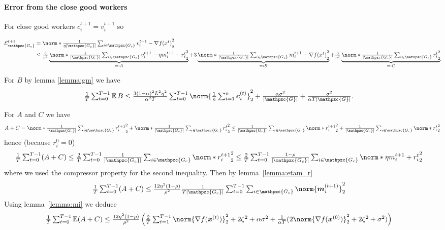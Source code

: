 \documentclass{article}
\newcommand{\gset}{\ensuremath{{\mathpzc{G}}}}
\newcommand{\gcset}{\ensuremath{{\mathpzc{G_c}}}}
\begin{document}
\paragraph*{Error from the close good workers}

For close good workers $c_i^{t+1} = v_i^{t+1}$ so

\begin{align*}
  \cE_\gcset^{t+1}
   & =
  \norm*{ \tfrac{1}{\eta |\gcset|} \tsum_{i\in\gcset} v_i^{t+1} - \nabla f(x^t) }_2^2
  \\
   & \le
  \tfrac{3}{\eta^2} \underbrace{ \norm*{ \tfrac{1}{|\gcset|} \tsum_{i\in\gcset} v_i^{t+1} - \eta m_i^{t+1} - r_i^t }_2^2 }_{=: A}
  + 3 \underbrace{ \norm*{ \tfrac{1}{|\gcset|} \tsum_{i\in\gcset} m_i^{t+1} - \nabla f(x^t)}_2^2 }_{=: B}
  + \tfrac{3}{\eta^2} \underbrace{ \norm*{ \tfrac{1}{|\gcset|} \tsum_{i\in\gcset} r_i^t }_2^2 }_{=: C}
\end{align*}

For $B$ by lemma \ref{lemma:gm} we have
\begin{align*}
  \tfrac{1}{T} \tsum_{t=0}^{T-1} \E B
   & \le
  \tfrac{3(1-\alpha)^2 L^2\eta^2}{\alpha^2T} \tsum_{t=0}^{T-1}
  \norm{ \tfrac{1}{n} \tsum_{i=1}^n \cc_i^{(t)} }_2^2
  + \tfrac{\alpha\sigma^2}{|\gset|} + \tfrac{\sigma^2}{\alpha T|\gset|}.
\end{align*}


For $A$ and $C$ we have
\begin{align*}
  A + C
  =
  \norm*{ \tfrac{1}{|\gcset|} \tsum_{i\in\gcset} r_i^{t+1} }_2^2
  + \norm*{ \tfrac{1}{|\gcset|} \tsum_{i\in\gcset} r_i^{t} }_2^2
  \le
  \tfrac{1}{|\gcset|} \tsum_{i\in\gcset} \norm*{ r_i^{t+1} }_2^2 + \tfrac{1}{|\gcset|} \tsum_{i\in\gcset} \norm*{ r_i^{t} }_2^2
\end{align*}
hence (because $r_i^0 = 0$)
\begin{align*}
  \tfrac{1}{T} \tsum_{t=0}^{T-1} (A + C)
   & \le
  \tfrac{2}{T} \tsum_{t=0}^{T-1} \tfrac{1}{|\gcset|} \tsum_{i\in\gcset} \norm*{ r_i^{t+1} }_2^2
  \le
  \tfrac{2}{T} \tsum_{t=0}^{T-1} \tfrac{1 - \rho}{|\gcset|} \tsum_{i\in\gcset} \norm*{ \eta m_i^{t+1} + r_i^t }_2^2
\end{align*}
where we used the compressor property for the second inequality.
Then by lemma~\ref{lemma:etam_r}
\begin{align*}
  \tfrac{1}{T} \tsum_{t=0}^{T-1} (A+C)
   & \le
  \tfrac{12\eta^2(1-\rho)}{\rho^2} \tfrac{1}{T|\gcset|}  \tsum_{t=0}^{T-1} \tsum_{i\in\gcset}\norm{\mm_i^{(t+1)} }_2^2
\end{align*}
Using lemma~\ref{lemma:mi} we deduce
\begin{align*}
  \tfrac{1}{T} \tsum_{t=0}^{T-1} \E (A+C)
   & \le
  \tfrac{12\eta^2(1-\rho)}{\rho^2}
  \left(
  \tfrac{2}{T}\tsum_{t=1}^{T-1} \norm{\nabla f(\xx^{(t)}) }_2^2
  +  2  \zeta^2
  + \alpha\sigma^2
  + \tfrac{1}{\alpha T}(2\norm{\nabla f(\xx^{(0)}) }_2^2
    + 2 \zeta^2
    + \sigma^2)
  \right)
\end{align*}
\end{document}

